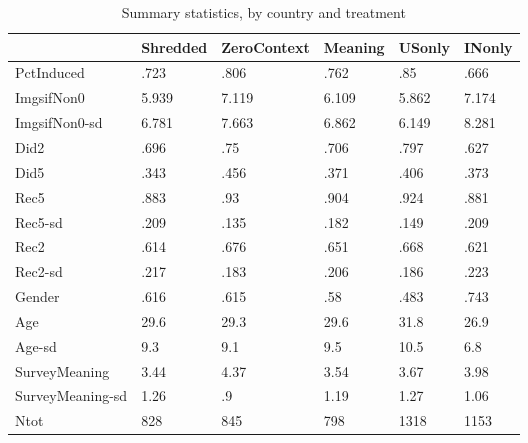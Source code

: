 \begin{table}[htbp]
\caption{\label{tab:summary_stats} Summary statistics, by country and treatment}\centering\medskip
\begin{tabular}{|l|l|l|l|l|l|}\hline  
 & Shredded  & ZeroContext  & Meaning  & USonly  & INonly  \\ \hline  
PctInduced & .723 & .806 & .762 & .85 & .666 \\ \hline 
ImgsifNon0 & 5.939 & 7.119 & 6.109 & 5.862 & 7.174 \\ \hline 
ImgsifNon0-sd & 6.781 & 7.663 & 6.862 & 6.149 & 8.281 \\ \hline 
Did2 & .696 & .75 & .706 & .797 & .627 \\ \hline 
Did5 & .343 & .456 & .371 & .406 & .373 \\ \hline 
Rec5 & .883 & .93 & .904 & .924 & .881 \\ \hline 
Rec5-sd & .209 & .135 & .182 & .149 & .209 \\ \hline 
Rec2 & .614 & .676 & .651 & .668 & .621 \\ \hline 
Rec2-sd & .217 & .183 & .206 & .186 & .223 \\ \hline 
Gender & .616 & .615 & .58 & .483 & .743 \\ \hline 
Age & 29.6 & 29.3 & 29.6 & 31.8 & 26.9 \\ \hline 
Age-sd & 9.3 & 9.1 & 9.5 & 10.5 & 6.8 \\ \hline 
SurveyMeaning & 3.44 & 4.37 & 3.54 & 3.67 & 3.98 \\ \hline 
SurveyMeaning-sd & 1.26 & .9 & 1.19 & 1.27 & 1.06 \\ \hline 
Ntot & 828 & 845 & 798 & 1318 & 1153 \\ \hline 
  \end{tabular}
\end{table}
